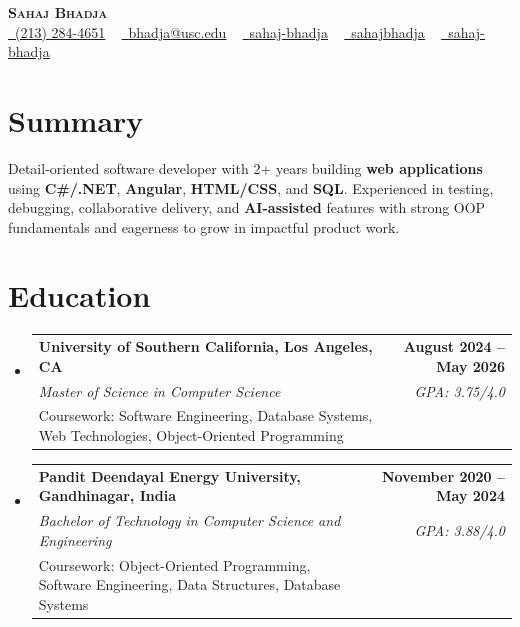 \documentclass[letterpaper,10pt]{article}
\makeatletter
\newcommand{\resumeEduSubheading}[5]{\vspace{-1pt}\item\begin{tabular*}{1.0\textwidth}[t]{l@{\extracolsep{\fill}}r}\textbf{#1} & \textbf{\small #2} \\\textit{\small #3} & \textit{\small #4} \\\small #5 & \\\end{tabular*}\vspace{-4pt}}
\newcommand{\resumeSubHeadingListStart}{\begin{itemize}[leftmargin=0.0in, label={}]}
\newcommand{\resumeSubHeadingListEnd}{\end{itemize}}
\makeatother
\begin{document}
\begin{center}
{\Huge \scshape \textbf{Sahaj Bhadja}} \\ \vspace{1pt}
\small \href{tel:(213) 284-4651}{\faPhone\ \underline{(213) 284-4651}} ~ \href{mailto:bhadja@usc.edu}{\raisebox{-0.2\height}\faEnvelope\ \underline{bhadja@usc.edu}} ~
\href{https://www.linkedin.com/in/sahaj-bhadja/}{\raisebox{-0.2\height}\faLinkedin\ \underline{sahaj-bhadja}} ~ \href{https://github.com/SAHAJ-BHADJA}{\raisebox{-0.2\height}\faGithub\ \underline{sahajbhadja}} ~
\href{https://sahaj-bhadja.vercel.app/}{\raisebox{-0.2\height}\faGlobe\ \underline{sahaj-bhadja}}
\end{center}
\vspace{-18pt}
\section{Summary}
\begin{itemize}[leftmargin=0.15in, label={}]
\small{\item{Detail-oriented software developer with 2+ years building \textbf{web applications} using \textbf{C\#/.NET}, \textbf{Angular}, \textbf{HTML/CSS}, and \textbf{SQL}. Experienced in testing, debugging, collaborative delivery, and \textbf{AI-assisted} features with strong OOP fundamentals and eagerness to grow in impactful product work.}}
\end{itemize}
\vspace{-16pt}
\section{Education}
\resumeSubHeadingListStart
\resumeEduSubheading{University of Southern California, Los Angeles, CA}{August 2024 -- May 2026}{Master of Science in Computer Science}{GPA: 3.75/4.0}{Coursework: Software Engineering, Database Systems, Web Technologies, Object-Oriented Programming}
\vspace{-9pt}
\resumeEduSubheading{Pandit Deendayal Energy University, Gandhinagar, India}{November 2020 -- May 2024}{Bachelor of Technology in Computer Science and Engineering}{GPA: 3.88/4.0}{Coursework: Object-Oriented Programming, Software Engineering, Data Structures, Database Systems}
\resumeSubHeadingListEnd
\vspace{-14pt}
\end{document}
